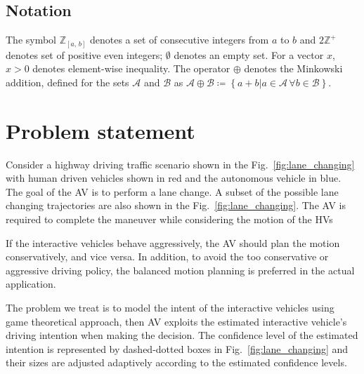 \documentclass[10pt,journal]{IEEEtran}
\begin{document}


	
	\subsection{Notation}
	The symbol $\mathbb{Z}_{\left[a,\, b\right]}$ denotes a set of consecutive integers from $a$ to $b$ and $2\mathbb{Z}^{+}$ denotes set of positive even integers; $\emptyset$ denotes an empty set. For a vector $x$, $x>0$ denotes element-wise inequality. The operator $\oplus$ denotes the Minkowski addition, defined for the sets $\mathcal{A}$ and $\mathcal{B}$ as $	\mathcal{A}\oplus\mathcal{B}\coloneqq\left\{ a+b | a\in\mathcal{A}\,\forall b\in\mathcal{B}\right\}$.
	


	

	\section{Problem statement}
	\label{sec:problem_statement}

	Consider a highway driving traffic scenario shown in the Fig.~\ref{fig:lane_changing} with human driven vehicles shown in red and the autonomous vehicle in blue. The goal of the AV is to perform a lane change. A subset of the possible lane changing trajectories are also shown in the Fig.~\ref{fig:lane_changing}. The AV is required to complete the maneuver while considering the motion of the HVs 

	
	
	If the interactive vehicles behave aggressively, the AV should plan the motion conservatively, and vice versa. In addition, to avoid the too conservative or aggressive driving policy, the balanced motion planning is preferred in the actual application.
	
	The problem we treat is to model the intent of the interactive vehicles using game theoretical approach, then AV exploits the estimated interactive vehicle's driving intention when making the decision. The confidence level of the estimated intention is represented by dashed-dotted boxes in Fig.~\ref{fig:lane_changing} and their sizes are adjusted adaptively according to the estimated confidence levels.
\end{document}
